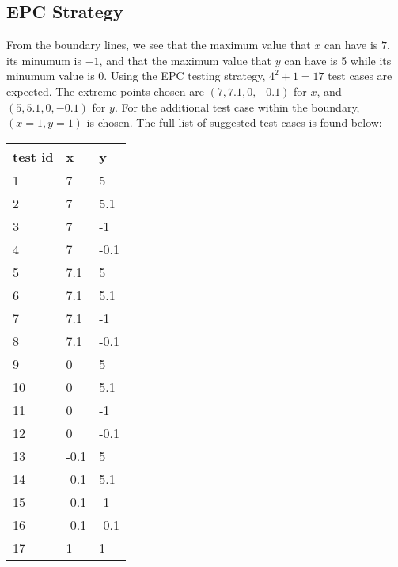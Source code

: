 \documentclass[letterpaper]{article}
\begin{document}
\subsection{EPC Strategy}
From the boundary lines, we see that the maximum value that $x$ can have is 
$7$, its minumum is $-1$, and that the maximum value that $y$ can have is
5 while its minumum value is 0. Using the EPC testing strategy, 
$4^2 + 1=17$ test cases are expected. The extreme points chosen are
$(7, 7.1, 0, -0.1)$ for $x$, and $(5, 5.1, 0, -0.1)$ for $y$.
For the additional test case within the boundary, $(x=1, y=1)$ is chosen.
The full list of suggested test cases is found below:


\begin{adjustbox}{center}
	\begin{tabular}{lll}
		test id & x    & y    \\ \hline
1       & 7    & 5    \\
2       & 7    & 5.1  \\
3       & 7    & -1   \\
4       & 7    & -0.1 \\
5       & 7.1  & 5    \\
6       & 7.1  & 5.1  \\
7       & 7.1  & -1   \\
8       & 7.1  & -0.1 \\
9       & 0    & 5    \\
10      & 0    & 5.1  \\
11      & 0    & -1   \\
12      & 0    & -0.1 \\
13      & -0.1 & 5    \\
14      & -0.1 & 5.1  \\
15      & -0.1 & -1   \\
16      & -0.1 & -0.1 \\
17      & 1    & 1    \\
\end{tabular}
\end{adjustbox}
\end{document}
